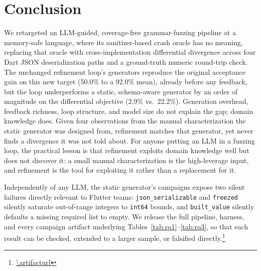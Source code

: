 \section{Conclusion}
\label{sec:conclusion}

We retargeted an LLM-guided, coverage-free grammar-fuzzing pipeline at a
memory-safe language, where its sanitizer-based crash oracle has no
meaning, replacing that oracle with cross-implementation differential
divergence across four Dart JSON deserialization paths and a ground-truth
numeric round-trip check. The unchanged refinement loop's generators
reproduce the original acceptance gain on this new target (50.0\% to a
92.0\% mean), already before any feedback, but the loop underperforms a static, schema-aware generator by an order of
magnitude on the differential objective (2.9\% vs.\ 22.2\%). Generation
overhead, feedback richness, loop structure, and model size do not explain
the gap; domain knowledge does. Given four observations from the manual
characterization the static generator was designed from, refinement matches
that generator, yet never finds a divergence it was not told about. For
anyone putting an LLM in a fuzzing loop, the practical lesson is that
refinement exploits domain knowledge well but does not discover it: a small
manual characterization is the high-leverage input, and refinement is the
tool for exploiting it rather than a replacement for it.

Independently of any LLM, the static generator's campaigns expose two
silent failures directly relevant to Flutter teams: \texttt{json\_serializable}
and \texttt{freezed} silently saturate out-of-range integers to
\texttt{int64} bounds, and \texttt{built\_value} silently defaults a
missing required list to empty. We release the full pipeline, harness, and
every campaign artifact underlying Tables~\ref{tab:rq1}--\ref{tab:rq3}, so
that each result can be checked, extended to a larger sample, or
falsified directly.\footnote{\url{\artifacturl}}
